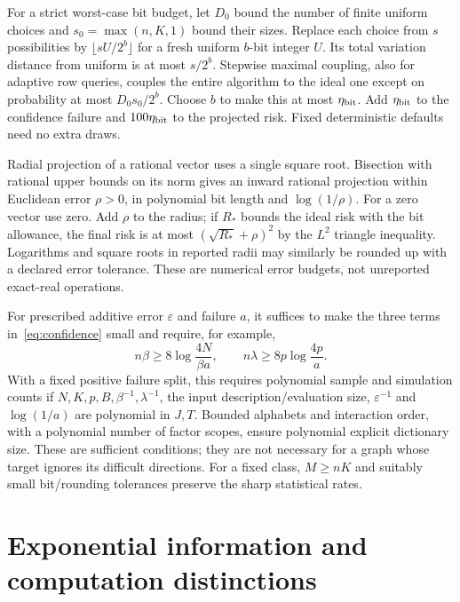 \documentclass[11pt,a4paper]{article}
\numberwithin{equation}{section}
\theoremstyle{definition}
\begin{document}
For a strict worst-case bit budget, let $D_0$ bound the number of finite
uniform choices and $s_0=\max(n,K,1)$ bound their sizes. Replace each
choice from $s$ possibilities by $\lfloor sU/2^b\rfloor$ for a fresh
uniform $b$-bit integer $U$. Its total variation distance from uniform
is at most $s/2^b$. Stepwise maximal coupling, also for adaptive row
queries, couples the entire algorithm to the ideal one except on
probability at most $D_0s_0/2^b$. Choose $b$ to make this at most
$\eta_{\rm bit}$. Add $\eta_{\rm bit}$ to the confidence failure and
$100\eta_{\rm bit}$ to the projected risk. Fixed deterministic defaults
need no extra draws.

Radial projection of a rational vector uses a single square root. Bisection
with rational upper bounds on its norm gives an inward rational projection
within Euclidean error $\rho>0$, in polynomial bit length and
$\log(1/\rho)$. For a zero vector use zero. Add $\rho$ to the radius;
if $R_*$ bounds the ideal risk with the bit allowance, the final risk is
at most $(\sqrt{R_*}+\rho)^2$ by the $L^2$ triangle inequality.
Logarithms and square roots in reported radii may similarly be rounded
up with a declared error tolerance. These are numerical error budgets,
not unreported exact-real operations.

For prescribed additive error $\varepsilon$ and failure $a$, it suffices
to make the three terms in~\eqref{eq:confidence} small and require, for
example,
\[
 n\beta\ge8\log\frac{4N}{\beta a},\qquad
 n\lambda\ge8p\log\frac{4p}{a}.
\]
With a fixed positive failure split, this requires polynomial sample and
simulation counts if $N,K,p,B,\beta^{-1},\lambda^{-1}$, the input
description/evaluation size, $\varepsilon^{-1}$ and $\log(1/a)$ are
polynomial in $J,T$. Bounded alphabets and interaction order, with a
polynomial number of factor scopes, ensure polynomial explicit
dictionary size. These are sufficient conditions; they are not necessary
for a graph whose target ignores its difficult directions. For a fixed
class, $M\ge nK$ and suitably small bit/rounding tolerances preserve the
sharp statistical rates.

\section{Exponential information and computation distinctions}\label{sec:exponential}
\end{document}
